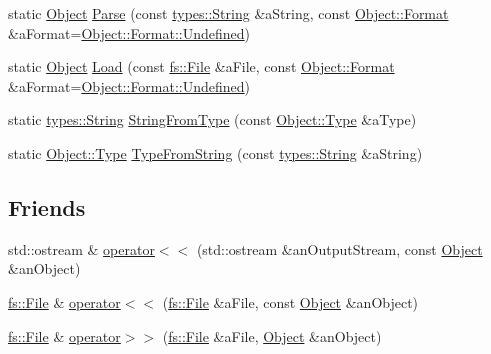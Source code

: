 \begin{DoxyCompactItemize}
\item 
static \hyperlink{classostk_1_1core_1_1ctnr_1_1_object}{Object} \hyperlink{classostk_1_1core_1_1ctnr_1_1_object_aa01a69916923ae04ffbbcef70cdd7106}{Parse} (const \hyperlink{classostk_1_1core_1_1types_1_1_string}{types\+::\+String} \&a\+String, const \hyperlink{classostk_1_1core_1_1ctnr_1_1_object_a3266b14cf7e3df39858f6572120e3b24}{Object\+::\+Format} \&a\+Format=\hyperlink{classostk_1_1core_1_1ctnr_1_1_object_a3266b14cf7e3df39858f6572120e3b24aec0fc0100c4fc1ce4eea230c3dc10360}{Object\+::\+Format\+::\+Undefined})
\item 
static \hyperlink{classostk_1_1core_1_1ctnr_1_1_object}{Object} \hyperlink{classostk_1_1core_1_1ctnr_1_1_object_a76b915fecff0936648e8a86958eca6b0}{Load} (const \hyperlink{classostk_1_1core_1_1fs_1_1_file}{fs\+::\+File} \&a\+File, const \hyperlink{classostk_1_1core_1_1ctnr_1_1_object_a3266b14cf7e3df39858f6572120e3b24}{Object\+::\+Format} \&a\+Format=\hyperlink{classostk_1_1core_1_1ctnr_1_1_object_a3266b14cf7e3df39858f6572120e3b24aec0fc0100c4fc1ce4eea230c3dc10360}{Object\+::\+Format\+::\+Undefined})
\item 
static \hyperlink{classostk_1_1core_1_1types_1_1_string}{types\+::\+String} \hyperlink{classostk_1_1core_1_1ctnr_1_1_object_a44338a6275cdfa67d6d1dcd193427d91}{String\+From\+Type} (const \hyperlink{classostk_1_1core_1_1ctnr_1_1_object_a49b70d4dce2d24126cd1df9aaf04d1ea}{Object\+::\+Type} \&a\+Type)
\item 
static \hyperlink{classostk_1_1core_1_1ctnr_1_1_object_a49b70d4dce2d24126cd1df9aaf04d1ea}{Object\+::\+Type} \hyperlink{classostk_1_1core_1_1ctnr_1_1_object_aee3629ea6eb94f24c26623406c71678b}{Type\+From\+String} (const \hyperlink{classostk_1_1core_1_1types_1_1_string}{types\+::\+String} \&a\+String)
\end{DoxyCompactItemize}
\subsection*{Friends}
\begin{DoxyCompactItemize}
\item 
std\+::ostream \& \hyperlink{classostk_1_1core_1_1ctnr_1_1_object_a418df9bf4a73078f3d494edef1743f8d}{operator$<$$<$} (std\+::ostream \&an\+Output\+Stream, const \hyperlink{classostk_1_1core_1_1ctnr_1_1_object}{Object} \&an\+Object)
\item 
\hyperlink{classostk_1_1core_1_1fs_1_1_file}{fs\+::\+File} \& \hyperlink{classostk_1_1core_1_1ctnr_1_1_object_af9350d4362cb9ad3424f4a6bb6d77a4c}{operator$<$$<$} (\hyperlink{classostk_1_1core_1_1fs_1_1_file}{fs\+::\+File} \&a\+File, const \hyperlink{classostk_1_1core_1_1ctnr_1_1_object}{Object} \&an\+Object)
\item 
\hyperlink{classostk_1_1core_1_1fs_1_1_file}{fs\+::\+File} \& \hyperlink{classostk_1_1core_1_1ctnr_1_1_object_ad91e1957f0afd5d49dde0b81d11a66e1}{operator$>$$>$} (\hyperlink{classostk_1_1core_1_1fs_1_1_file}{fs\+::\+File} \&a\+File, \hyperlink{classostk_1_1core_1_1ctnr_1_1_object}{Object} \&an\+Object)
\end{DoxyCompactItemize}


